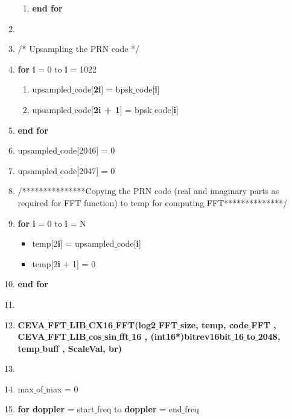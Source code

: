\documentclass[journal,10pt,onecolumn]{article}
\begin{document}
\begin{itemize}
\begin{enumerate}
\begin{enumerate}
        \item[] \textbf{end for}
    \end{enumerate}
    \item[]
    \item[] /* Upsampling the PRN code */
    \item[] \textbf{for} \textbf{i} = 0 to \textbf{i} = 1022
    \begin{enumerate}
        \item[] upsampled$\_$code[\textbf{2i}] =  bpsk$\_$code[\textbf{i}]
        \item[] upsampled$\_$code[\textbf{2i + 1}] =  bpsk$\_$code[\textbf{i}]
    \end{enumerate}
    \item[] \textbf{end for}
    \item[] upsampled$\_$code[2046] = 0
    \item[] upsampled$\_$code[2047] = 0
    \item[] /***************Copying the PRN code (real and imaginary parts as required for FFT function) to temp for computing FFT**************/
    \item[] \textbf{for} \textbf{i} = 0 to \textbf{i} = N
    \begin{itemize}
        \item[] temp[2\textbf{i}]     =  upsampled$\_$code[\textbf{i}]
        \item[] temp[2\textbf{i} + 1] =  0
    \end{itemize}
    \item[] \textbf{end for}
    \item[] 
    \item[] \textbf{CEVA$\_$FFT$\_$LIB$\_$CX16$\_$FFT(log2$\_$FFT$\_$size, temp, code$\_$FFT , CEVA$\_$FFT$\_$LIB$\_$cos$\_$sin$\_$fft$\_$16 , (int16*)bitrev16bit$\_$16$\_$to$\_$2048, temp$\_$buff , ScaleVal, br)}
    \item[] 
    \item[] max$\_$of$\_$max = 0
    \item[] \textbf{for} \textbf{doppler} = start$\_$freq to \textbf{doppler} = end$\_$freq
    \begin{enumerate}
    

\end{enumerate}
\end{enumerate}
\end{itemize}
\end{document}
